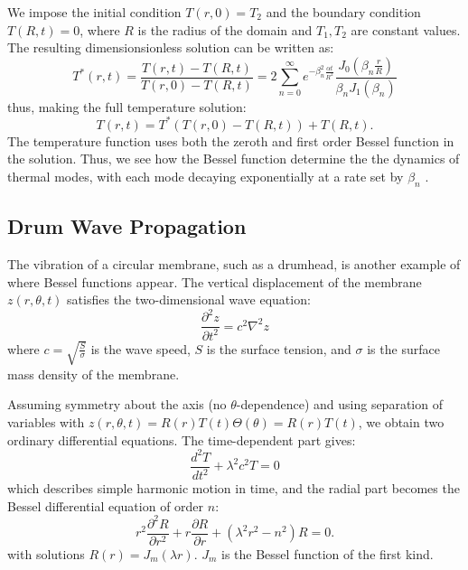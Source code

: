 \documentclass[linenumbers, twocolumn]{aastex631}
\begin{document}
\noindent We impose the initial condition $T(r,0)=T_2$ and the boundary condition
$T(R,t)=0$, where $R$ is the radius of the domain and $T_1,T_2$ are constant
values. The resulting dimensionsionless solution can be written as:
\begin{equation}
    T^*(r,t)=\frac{T(r,t)-T(R,t)}{T(r,0)-T(R,t)}=2\sum_{n=0}^\infty e^{-\beta_n^2\frac{\alpha t}{R^2}}\frac{J_0(\beta_n\frac{r}{R})}{\beta_nJ_1(\beta_n)}
\end{equation}
\noindent thus, making the full temperature solution:
\begin{equation}
    T(r,t)=T^*(T(r,0)-T(R,t))+T(R,t).
\end{equation}
\noindent The temperature function uses both the zeroth and first order
Bessel function in the solution. Thus, we see how the Bessel function determine the
the dynamics of thermal modes, with each mode decaying exponentially at a rate set
by $\beta_n$ \cite{tsega}.\\


\subsection{Drum Wave Propagation}

The vibration of a circular membrane, such as a drumhead, is another example of
where Bessel functions appear. The vertical displacement of the membrane $z(r,\theta,t)$
satisfies the two-dimensional wave equation:
\begin{equation}
    \frac{\partial^2z}{\partial t^2}=c^2\nabla^2z
\end{equation}
\noindent where $c=\sqrt{\frac{S}{\sigma}}$ is the wave speed, $S$ is the surface
tension, and $\sigma$ is the surface mass density of the membrane. 

\noindent Assuming symmetry about the axis (no $\theta$-dependence) and using
separation of variables with $z(r,\theta,t)=R(r)T(t)\Theta(\theta)=R(r)T(t)$,
we obtain two ordinary differential equations. The time-dependent part gives:
\begin{equation}
    \frac{d^2T}{dt^2}+\lambda^2c^2T=0
\end{equation}
\noindent which describes simple harmonic motion in time, and the radial part
 becomes the Bessel differential equation of order $n$:
\begin{equation}
    r^2\frac{\partial^2R}{\partial r^2}+r\frac{\partial R}{\partial r}+(\lambda^2r^2-n^2)R=0.
\end{equation}
\noindent with solutions $R(r)=J_m(\lambda r)$. $J_m$ is the Bessel
function of the first kind.
\end{document}

